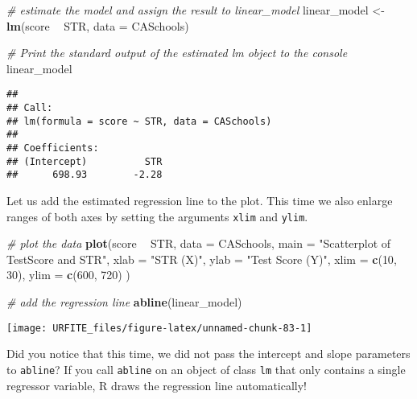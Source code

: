\documentclass[]{book}
\newenvironment{Shaded}{\begin{snugshade}}{\end{snugshade}}
\newcommand{\KeywordTok}[1]{\textcolor[rgb]{0.13,0.29,0.53}{\textbf{#1}}}
\newcommand{\DataTypeTok}[1]{\textcolor[rgb]{0.13,0.29,0.53}{#1}}
\newcommand{\DecValTok}[1]{\textcolor[rgb]{0.00,0.00,0.81}{#1}}
\newcommand{\StringTok}[1]{\textcolor[rgb]{0.31,0.60,0.02}{#1}}
\newcommand{\CommentTok}[1]{\textcolor[rgb]{0.56,0.35,0.01}{\textit{#1}}}
\newcommand{\OperatorTok}[1]{\textcolor[rgb]{0.81,0.36,0.00}{\textbf{#1}}}
\newcommand{\NormalTok}[1]{#1}
\theoremstyle{definition}
\theoremstyle{definition}
\theoremstyle{definition}
\theoremstyle{remark}
\begin{document}
\begin{Shaded}
\begin{Highlighting}[]
\CommentTok{# estimate the model and assign the result to linear_model}
\NormalTok{linear_model <-}\StringTok{ }\KeywordTok{lm}\NormalTok{(score }\OperatorTok{~}\StringTok{ }\NormalTok{STR, }\DataTypeTok{data =}\NormalTok{ CASchools)}

\CommentTok{# Print the standard output of the estimated lm object to the console }
\NormalTok{linear_model}
\end{Highlighting}
\end{Shaded}

\begin{verbatim}
## 
## Call:
## lm(formula = score ~ STR, data = CASchools)
## 
## Coefficients:
## (Intercept)          STR  
##      698.93        -2.28
\end{verbatim}

Let us add the estimated regression line to the plot. This time we also
enlarge ranges of both axes by setting the arguments \texttt{xlim} and
\texttt{ylim}.

\begin{Shaded}
\begin{Highlighting}[]
\CommentTok{# plot the data}
\KeywordTok{plot}\NormalTok{(score }\OperatorTok{~}\StringTok{ }\NormalTok{STR, }
     \DataTypeTok{data =}\NormalTok{ CASchools,}
     \DataTypeTok{main =} \StringTok{"Scatterplot of TestScore and STR"}\NormalTok{, }
     \DataTypeTok{xlab =} \StringTok{"STR (X)"}\NormalTok{,}
     \DataTypeTok{ylab =} \StringTok{"Test Score (Y)"}\NormalTok{,}
     \DataTypeTok{xlim =} \KeywordTok{c}\NormalTok{(}\DecValTok{10}\NormalTok{, }\DecValTok{30}\NormalTok{),}
     \DataTypeTok{ylim =} \KeywordTok{c}\NormalTok{(}\DecValTok{600}\NormalTok{, }\DecValTok{720}\NormalTok{)}
\NormalTok{     )}

\CommentTok{# add the regression line}
\KeywordTok{abline}\NormalTok{(linear_model) }
\end{Highlighting}
\end{Shaded}

\begin{center}\texttt{[image: URFITE\_files/figure-latex/unnamed-chunk-83-1]} \end{center}

Did you notice that this time, we did not pass the intercept and slope
parameters to \texttt{abline}? If you call \texttt{abline} on an object
of class \texttt{lm} that only contains a single regressor variable, R
draws the regression line automatically!
\end{document}
